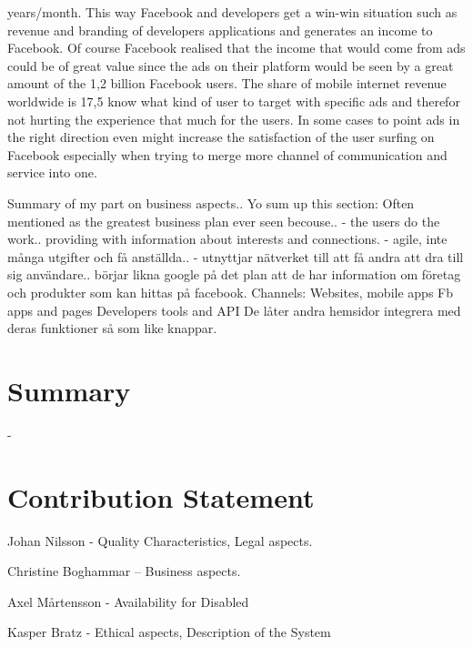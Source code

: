 \documentclass[conference]{IEEEtran}
\begin{document}
years/month.
This way Facebook and developers get a win-win situation such as revenue and
branding of developers applications and generates an income to Facebook. Of
course Facebook realised that the income that would come from ads could be of
great value since the ads on their platform would be seen by a great amount of
the 1,2 billion Facebook users. The share of mobile internet revenue worldwide
is 17,5%
know what kind of user to target with specific ads and therefor not hurting the
experience that much for the users. In some cases to point ads in the right
direction even might increase the satisfaction of the user surfing on Facebook
especially when trying to merge more channel of communication and service into
one. 

Summary of my part on business aspects..
Yo sum up this section:
Often mentioned as the greatest business plan ever seen becouse..
- the users do the work.. providing with information about interests and
connections.
- agile, inte många utgifter och få anställda.. 
- utnyttjar nätverket till att få andra att dra till sig användare.. 
börjar likna google på det plan att de har information om företag och produkter
som kan hittas på facebook. 
Channels:
Websites, mobile apps
Fb apps and pages
Developers tools and API
De låter andra hemsidor integrera med deras funktioner så som like knappar.


\section{Summary} 
- 

\section{Contribution Statement} 

Johan Nilsson - Quality
Characteristics, Legal aspects.

Christine Boghammar – Business aspects.

Axel Mårtensson - Availability for Disabled

Kasper Bratz - Ethical aspects, Description of the System
\end{document}
